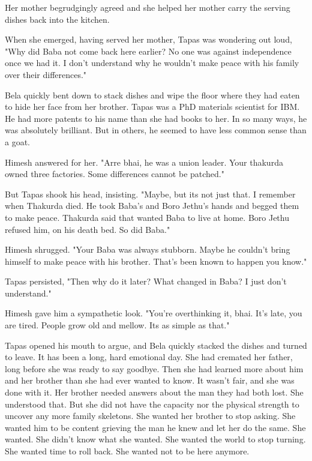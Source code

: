 \documentclass{amsart}
\begin{document}
Her mother begrudgingly agreed and she helped her mother carry the serving dishes back into the kitchen. 

When she emerged, having served her mother, Tapas was wondering out loud, "Why did Baba not come back here earlier? No one was against independence once we had it. I don't understand why he wouldn't make peace with his family over their differences." 

Bela quickly bent down to stack dishes and wipe the floor where they had eaten to hide her face from her brother. Tapas was a PhD materials scientist for IBM. He had more patents to his name than she had books to her. In so many ways, he was absolutely brilliant. But in others, he seemed to have less common sense than a goat.

Himesh answered for her. "Arre bhai, he was a union leader. Your thakurda owned three factories. Some differences cannot be patched."

But Tapas shook his head, insisting. "Maybe, but its not just that. I remember when Thakurda died. He took Baba's and Boro Jethu's hands and begged them to make peace. Thakurda said that wanted Baba to live at home. Boro Jethu refused him, on his death bed. So did Baba." 

Himesh shrugged. "Your Baba was always stubborn. Maybe he couldn't bring himself to make peace with his brother. That's been known to happen you know."

Tapas persisted, "Then why do it later? What changed in Baba? I just don't understand." 

Himesh gave him a sympathetic look. "You're overthinking it, bhai. It's late, you are tired. People grow old and mellow. Its as simple as that." 

Tapas opened his mouth to argue, and Bela quickly stacked the dishes and turned to leave. It has been a long, hard emotional day. She had cremated her father, long before she was ready to say goodbye. Then she had learned more about him and her brother than she had ever wanted to know. It wasn't fair, and she was done with it. Her brother needed answers about the man they had both lost. She understood that. But she did not have the capacity nor the physical strength to uncover any more family skeletons. She wanted her brother to stop asking. She wanted him to be content grieving the man he knew and let her do the same. She wanted. She didn't know what she wanted. She wanted the world to stop turning. She wanted time to roll back. She wanted not to be here anymore. 
\end{document}
